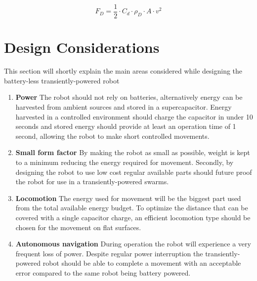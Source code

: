 \begin{equation}
F_{D} = \frac{1}{2} \cdot C_{d} \cdot \rho_{D} \cdot A \cdot v^2 
\end{equation}


\section{Design Considerations}
\label{sec:design_considerations}

This section will shortly explain the main areas considered while designing the battery-less transiently-powered robot



\begin{enumerate}
\item \textbf{Power} The robot should not rely on batteries, alternatively energy can be harvested from ambient sources and stored in a supercapacitor. 
Energy harvested in a controlled environment should charge the capacitor in under 10 seconds and stored energy should provide at least an operation time of 1 second, allowing the robot to make short controlled movements.

\item \textbf{Small form factor} By making the robot as small as possible, weight is kept to a minimum reducing the energy required for movement.
Secondly, by designing the robot to use low cost regular available parts should future proof the robot for use in a transiently-powered swarms.

\item \textbf{Locomotion}
The energy used for movement will be the biggest part used from the total available energy budget.
To optimize the distance that can be covered with a single capacitor charge, an efficient locomotion type should be chosen for the movement on flat surfaces.

\item \textbf{Autonomous navigation}
During operation the robot will experience a very frequent loss of power. 
Despite regular power interruption the transiently-powered robot should be able to complete a movement with an acceptable error compared to the same robot being battery powered. 

\end{enumerate}


